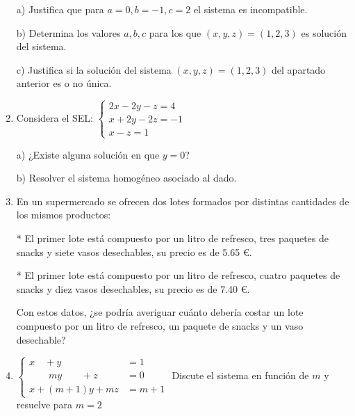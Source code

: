 \begin{enumerate}
a) Justifica que para $a=0, b=-1, c=2$ el sistema es incompatible.

b) Determina los valores $a,b,c$ para los que $(x,y,z)=(1,2,3)$ es solución del sistema.

c) Justifica si la solución del sistema $(x,y,z)=(1,2,3)$ del apartado anterior es o no única.




\item Considera el SEL:  $\begin{cases} 2x-2y-z=4\\x+2y-2z=-1\\x-z=1 \end{cases}$

a) ¿Existe alguna solución en que $y=0$?

b) Resolver el sistema homogéneo asociado al dado.


\item En un supermercado se ofrecen dos lotes formados por distintas cantidades de los mismos productos:

* El primer lote está compuesto por un litro de refresco, tres paquetes de snacks y siete vasos desechables, su precio es de 5.65 €.

*  El primer lote está compuesto por un litro de refresco, cuatro paquetes de snacks y diez vasos desechables, su precio es de 7.40 €.

Con estos datos, ¿se podría averiguar cuánto debería costar un lote compuesto por un litro de refresco, un paquete de snacks y un vaso desechable?


\item $\begin{cases} x\quad +y&=1\\ \qquad my \qquad +z&=0\\x+(m+1)y+mz&=m+1 \end{cases}  $ Discute el sistema en función de $m$ y resuelve para $m=2$


\end{enumerate}
